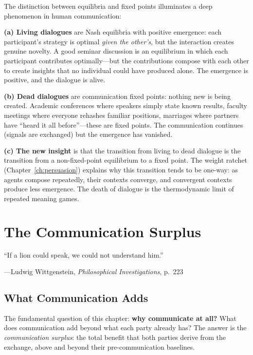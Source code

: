 \begin{interpretation}
The distinction between equilibria and fixed points illuminates a deep
phenomenon in human communication:

\textbf{(a) Living dialogues} are Nash equilibria with positive emergence:
each participant's strategy is optimal \emph{given the other's}, but the
interaction creates genuine novelty. A good seminar discussion is an
equilibrium in which each participant contributes optimally---but the
contributions compose with each other to create insights that no
individual could have produced alone. The emergence is positive, and
the dialogue is alive.

\textbf{(b) Dead dialogues} are communication fixed points: nothing
new is being created. Academic conferences where speakers simply state
known results, faculty meetings where everyone rehashes familiar positions,
marriages where partners have ``heard it all before''---these are fixed
points. The communication continues (signals are exchanged) but the
emergence has vanished.

\textbf{(c) The new insight} is that the transition from living to dead
dialogue is the transition from a non-fixed-point equilibrium to a fixed
point. The weight ratchet (Chapter~\ref{ch:persuasion}) explains why this
transition tends to be one-way: as agents compose repeatedly, their
contexts converge, and convergent contexts produce less emergence. The
death of dialogue is the thermodynamic limit of repeated meaning games.
\end{interpretation}



\chapter{The Communication Surplus}
\label{ch:surplus}

\epigraph{``If a lion could speak, we could not understand him.''}
{---Ludwig Wittgenstein, \emph{Philosophical Investigations}, p.~223}


\section{What Communication Adds}

The fundamental question of this chapter: \textbf{why communicate at all?}
What does communication add beyond what each party already has? The answer is
the \emph{communication surplus}: the total benefit that both parties derive
from the exchange, above and beyond their pre-communication baselines.

